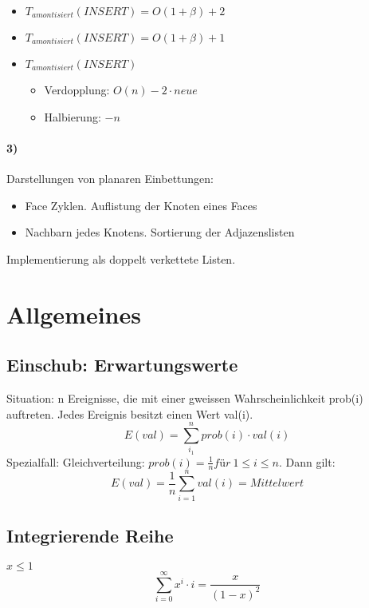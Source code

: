 \begin{itemize}
    \item $ T_{amontisiert} (INSERT) = O(1+\beta) + 2$  
    \item $ T_{amontisiert} (INSERT) = O(1+\beta) + 1$
    \item $ T_{amontisiert} (INSERT)$
    \begin{itemize}
        \item Verdopplung: $O(n) - 2\cdot neue$
        \item Halbierung: $-n$
    \end{itemize}
\end{itemize}

\paragraph{3)} Darstellungen von planaren Einbettungen:
\begin{itemize}
    \item Face Zyklen. Auflistung der Knoten eines Faces 
    \item Nachbarn jedes Knotens. Sortierung der Adjazenslisten
\end{itemize}
Implementierung als doppelt verkettete Listen.


\section{Allgemeines}
\subsection{Einschub: Erwartungswerte}
Situation: n Ereignisse, die mit einer gweissen Wahrscheinlichkeit prob(i) auftreten. Jedes Ereignis besitzt einen Wert val(i). 
$$E(val) = \sum_{i_1}^{n} prob(i)\cdot val(i) $$
Spezialfall: Gleichverteilung: $ prob(i)=\frac{1}{n} für\ 1\leq i \leq n $. Dann gilt:
$$ E(val)= \frac{1}{n} \sum_{i=1}^{n}val(i) = Mittelwert $$

\subsection{Integrierende Reihe}
$ x \leq 1 $
$$ \sum_{i=0}^\infty x^i \cdot i = \frac{x}{(1-x)^2}$$




